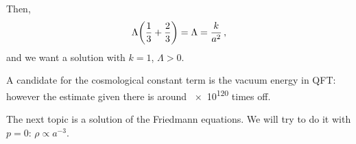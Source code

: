 \documentclass[main.tex]{subfiles}
\begin{document}
Then, 
%
\begin{equation}
  \Lambda \qty(\frac{1}{3}+ \frac{2}{3}) = \Lambda = \frac{k}{a^2}
\,,
\end{equation}
%
and we want a solution with \(k=1\), \(\Lambda > 0\).

A candidate for the cosmological constant term is the vacuum energy in QFT: however the estimate given there is around \num{e120} times off.

The next topic is a solution of the Friedmann equations.
We will try to do it with \(p=0\): \(\rho \propto a^{-3}\).
\end{document}
